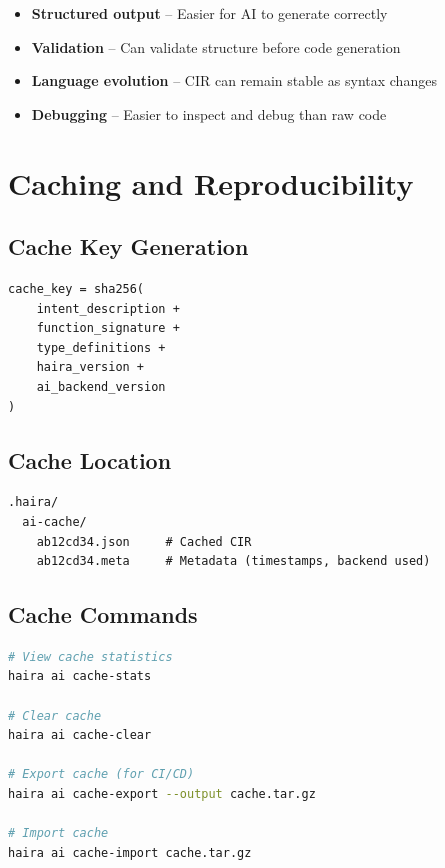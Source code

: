 \begin{itemize}
    \item \textbf{Structured output} -- Easier for AI to generate correctly
    \item \textbf{Validation} -- Can validate structure before code generation
    \item \textbf{Language evolution} -- CIR can remain stable as syntax changes
    \item \textbf{Debugging} -- Easier to inspect and debug than raw code
\end{itemize}

\section{Caching and Reproducibility}

\subsection{Cache Key Generation}

\begin{lstlisting}[language={}]
cache_key = sha256(
    intent_description +
    function_signature +
    type_definitions +
    haira_version +
    ai_backend_version
)
\end{lstlisting}

\subsection{Cache Location}

\begin{lstlisting}[language={}]
.haira/
  ai-cache/
    ab12cd34.json     # Cached CIR
    ab12cd34.meta     # Metadata (timestamps, backend used)
\end{lstlisting}

\subsection{Cache Commands}

\begin{lstlisting}[language=bash,numbers=none]
# View cache statistics
haira ai cache-stats

# Clear cache
haira ai cache-clear

# Export cache (for CI/CD)
haira ai cache-export --output cache.tar.gz

# Import cache
haira ai cache-import cache.tar.gz
\end{lstlisting}

